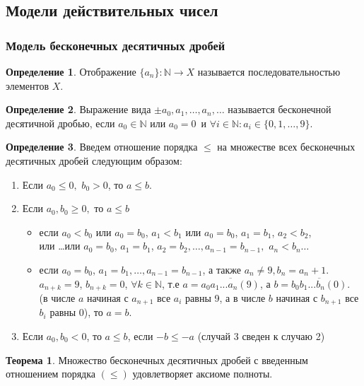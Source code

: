 \documentclass[a4paper, 12pt]{article}
\newcommand{\N}{\mathbb{N}}
\theoremstyle{definition}
\newtheorem*{definition}{Определение}
\newtheorem*{theorem}{Теорема}
\begin{document}
    \subsection{Модели действительных чисел}
    \subsubsection*{Модель бесконечных десятичных дробей}
        \begin{definition}
            Отображение $\{a_n\}: \N \to X$ называется последовательностью элементов $X$.
        \end{definition}
        \begin{definition}
            Выражение вида $\pm a_0,a_1,\dots, a_n, \dots$ называется бесконечной десятичной дробью, если $a_0\in \N$ или $a_0=0$\ и $\forall i\in \N: a_i \in \{0,1,\dots, 9\}$.
        \end{definition}
        \begin{definition}
            Введем отношение порядка $\leq$ на множестве всех бесконечных десятичных дробей следующим образом:
            \begin{enumerate}
                \item Если $a_0\leq 0,$ $b_0>0$, то $a\leq b$.
                \item Если $a_0, b_0\geq 0,$ то $a\leq b$
                \begin{itemize}
                    \item если $a_0<b_0$ или $a_0=b_0$, $a_1<b_1$ или $a_0=b_0$, $a_1=b_1$, $a_2<b_2$,\\ или \dots или $a_0=b_0$, $a_1=b_1$, $a_2=b_2, \dots, a_{n-1}=b_{n-1},$ $a_n<b_n\dots$
                    \item если $a_0=b_0$, $a_1=b_1, \dots, a_{n-1}=b_{n-1}$, а также $a_n\ne 9, b_n=a_{n}+1$.
                    $a_{n+k}=9$, $b_{n+k}=0$, $\forall k \in \N$, т.е $a=\overline{a_0a_1...a_n(9)}$, а $b=\overline{b_0b_1...b_n(0)}$.\\
                    (в числе $a$ начиная с $a_{n+1}$ все $a_i$ равны 9, а в числе $b$ начиная с $b_{n+1}$ все $b_i$ равны 0), то $a=b$.
                \end{itemize}
                \item Если $a_0, b_0<0$, то $a\leq b$, если $-b\leq -a$ (случай 3 сведен к случаю 2)
            \end{enumerate}
        \end{definition} 
        \begin{theorem}
            Множество бесконечных десятичных дробей с введенным отношением порядка $(\leq)$ удовлетворяет аксиоме полноты.
        \end{theorem} 
\end{document}
